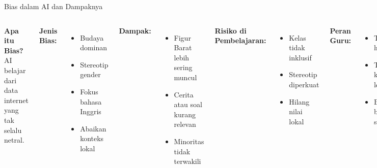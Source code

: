 \documentclass[aspectratio=169, table]{beamer}
\begin{document}
\begin{frame}[fragile]{Bias dalam AI dan Dampaknya}
	\vspace{20pt}
	\begin{columns}[t]
		\textbf{Apa itu Bias?} \\
		AI belajar dari data internet yang tak selalu netral.
		
		\vspace{4pt}
		\textbf{Jenis Bias:}
		\begin{itemize}
			\item Budaya dominan
			\item Stereotip gender
			\item Fokus bahasa Inggris
			\item Abaikan konteks lokal
		\end{itemize}
		
		\vspace{4pt}
		\textbf{Dampak:}
		\begin{itemize}
			\item Figur Barat lebih sering muncul
			\item Cerita atau soal kurang relevan
			\item Minoritas tidak terwakili
		\end{itemize}
		
		\textbf{Risiko di Pembelajaran:}
		\begin{itemize}
			\item Kelas tidak inklusif
			\item Stereotip diperkuat
			\item Hilang nilai lokal
		\end{itemize}
		
		\vspace{3pt}
		\textbf{Peran Guru:}
		\begin{itemize}
			\item Tinjau hasil AI
			\item Tambahkan konteks lokal
			\item Bahas bias bersama siswa
		\end{itemize}
		
		\vspace{3pt}
		\textbf{Contoh Prompt Korektif:}
		\texttt{"Sebutkan 5 tokoh perempuan Asia Tenggara di bidang pendidikan."}
	\end{columns}
\end{frame}
\end{document}
